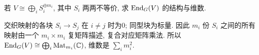 \begin{exercise}
若 $V\cong\bigoplus_i S_i^{\oplus m_i}$, 其中 $S_i$ 两两不等价, 求 $\operatorname{End}_G(V)$ 的结构与维数.
\end{exercise}
\begin{solution}
交织映射的各块 $S_i\to S_j$ 在 $i\ne j$ 时为0; 同型块为标量. 因此 $m_i$ 份 $S_i$ 之间的所有映射由一个 $m_i\times m_i$ 复矩阵描述, 复合对应矩阵乘法. 所以 $\operatorname{End}_G(V)\cong\bigoplus_i\operatorname{Mat}_{m_i}(\mathbb C)$, 维数是 $\sum_i m_i^2$.
\end{solution}
